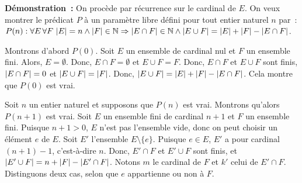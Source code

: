 \medskip

\noindent\textbf{Démonstration :} On procède par récurrence sur le cardinal de $E$. 
    On veux montrer le prédicat $P$ à un paramètre libre défini pour tout entier naturel $n$ par : $P(n): \forall E \, \forall F \, \left\lvert E \right\rvert = n \wedge \left\lvert F \right\rvert \in \mathbb{N} \Rightarrow \left\lvert E \cap F \right\rvert \in \mathbb{N} \wedge \left\lvert E \cup F \right\rvert = \left\lvert E \right\rvert + \left\lvert F \right\rvert - \left\lvert E \cap F \right\rvert$. 

    Montrons d'abord $P(0)$. 
    Soit $E$ un ensemble de cardinal nul et $F$ un ensemble fini. 
    Alors, $E = \emptyset$. 
    Donc, $E \cap F = \emptyset$ et $E \cup F = F$. 
    Donc, $E \cap F$ et $E \cup F$ sont finis, $\left\lvert E \cap F \right\rvert = 0$ et $\left\lvert E \cup F \right\rvert = \left\lvert F \right\rvert$. 
    Donc, $\left\lvert E \cup F \right\rvert = \left\lvert E \right\rvert + \left\lvert F \right\rvert - \left\lvert E \cap F \right\rvert$.
    Cela montre que $P(0)$ est vrai.

    Soit $n$ un entier naturel et supposons que $P(n)$ est vrai. 
    Montrons qu'alors $P(n+1)$ est vrai.
    Soit $E$ un ensemble fini de cardinal $n+1$ et $F$ un ensemble fini. 
    Puisque $n+1 > 0$, $E$ n'est pas l'ensemble vide, donc on peut choisir un élément $e$ de $E$. 
    Soit $E'$ l'ensemble $E \setminus \lbrace e \rbrace$. 
    Puisque $e \in E$, $E'$ a pour cardinal $(n+1)-1$, c'est-à-dire $n$. 
    Donc, $E' \cap F$ et $E' \cup F$ sont finis, et $\left\lvert E' \cup F \right\rvert = n + \left\lvert F \right\rvert - \left\lvert E' \cap F \right\rvert$. 
    Notons $m$ le cardinal de $F$ et $k'$ celui de $E' \cap F$.
    Distinguons deux cas, selon que $e$ appartienne ou non à $F$. 
    
